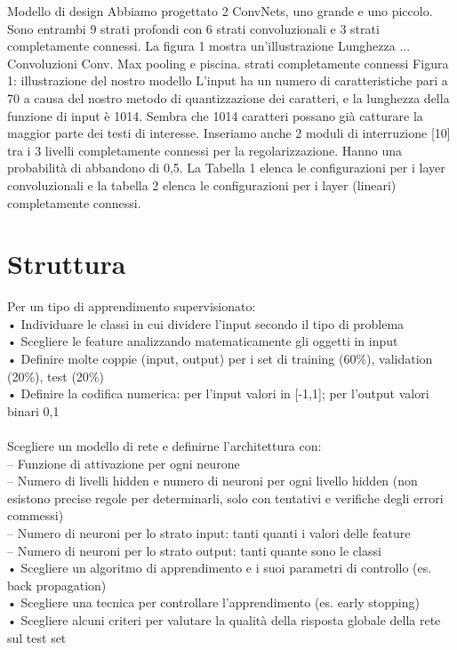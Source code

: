 Modello di design
Abbiamo progettato 2 ConvNets, uno grande e uno piccolo. Sono entrambi 9 strati profondi con 6 strati convoluzionali e 3 strati completamente connessi. La figura 1 mostra un'illustrazione
Lunghezza
...
Convoluzioni Conv. Max pooling e piscina. strati completamente connessi
Figura 1: illustrazione del nostro modello
L'input ha un numero di caratteristiche pari a 70 a causa del nostro metodo di quantizzazione dei caratteri, e la lunghezza della funzione di input è 1014. Sembra che 1014 caratteri possano già catturare la maggior parte dei testi di interesse. Inseriamo anche 2 moduli di interruzione [10] tra i 3 livelli completamente connessi per la regolarizzazione. Hanno una probabilità di abbandono di 0,5. La Tabella 1 elenca le configurazioni per i layer convoluzionali e la tabella 2 elenca le configurazioni per i layer (lineari) completamente connessi.


\section{Struttura}
\label{sec:struttura}
Per un tipo di apprendimento supervisionato:\\
• Individuare le classi in cui dividere l’input secondo il tipo di problema\\
• Scegliere le feature analizzando matematicamente gli oggetti in input\\
• Definire molte coppie (input, output) per i set di training (60\%), validation (20\%), test (20\%)\\
• Definire la codifica numerica: per l’input valori in [-1,1]; per l’output valori binari {0,1}\\
\\
Scegliere un modello di rete e definirne l’architettura con:\\
– Funzione di attivazione per ogni neurone\\
– Numero di livelli hidden e numero di neuroni per ogni livello hidden (non esistono precise regole per determinarli, solo con tentativi e verifiche degli errori commessi)\\
– Numero di neuroni per lo strato input: tanti quanti i valori delle feature\\
– Numero di neuroni per lo strato output: tanti quante sono le classi\\
• Scegliere un algoritmo di apprendimento e i suoi parametri di controllo (es. back propagation)\\
• Scegliere una tecnica per controllare l’apprendimento (es. early stopping)\\
• Scegliere alcuni criteri per valutare la qualità della risposta globale della rete sul test set\\
\\






